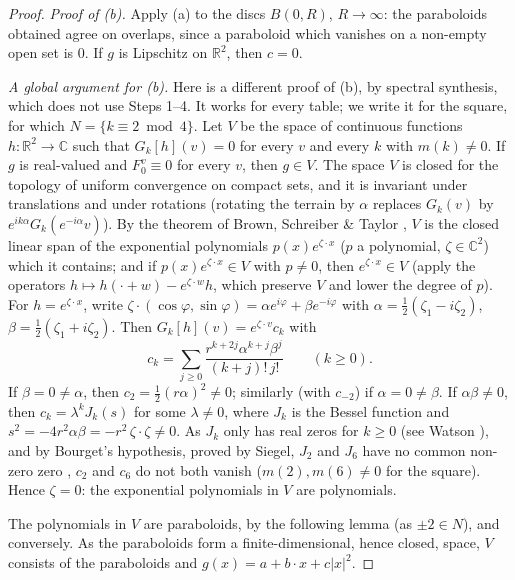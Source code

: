 \documentclass[a4paper,11pt,twoside,leqno]{article}
\newcommand{\rr}[0]{\ensuremath{\mathbb{R}}}
\numberwithin{equation}{section}
\begin{document}
\begin{proof}
\emph{Proof of (b).} Apply (a) to the discs $B(0, R)$, $R \to \infty$: the paraboloids obtained agree on overlaps, since a paraboloid which vanishes on a non-empty open set is $0$. If $g$ is Lipschitz on $\rr^2$, then $c = 0$.

\emph{A global argument for (b).} Here is a different proof of (b), by spectral synthesis, which does not use Steps 1--4. It works for every table; we write it for the square, for which $N = \{k \equiv 2 \bmod 4\}$. Let $V$ be the space of continuous functions $h : \rr^2 \to \mathbb{C}$ such that $G_k[h](v) = 0$ for every $v$ and every $k$ with $m(k) \neq 0$. If $g$ is real-valued and $F_0^v \equiv 0$ for every $v$, then $g \in V$. The space $V$ is closed for the topology of uniform convergence on compact sets, and it is invariant under translations and under rotations (rotating the terrain by $\alpha$ replaces $G_k(v)$ by $e^{ik\alpha} G_k(e^{-i\alpha} v)$). By the theorem of Brown, Schreiber \& Taylor \cite{BST}, $V$ is the closed linear span of the exponential polynomials $p(x) e^{\zeta \cdot x}$ ($p$ a polynomial, $\zeta \in \mathbb{C}^2$) which it contains; and if $p(x)e^{\zeta\cdot x} \in V$ with $p \neq 0$, then $e^{\zeta \cdot x} \in V$ (apply the operators $h \mapsto h(\cdot + w) - e^{\zeta \cdot w} h$, which preserve $V$ and lower the degree of $p$). For $h = e^{\zeta\cdot x}$, write $\zeta \cdot (\cos\varphi, \sin\varphi) = \alpha e^{i\varphi} + \beta e^{-i\varphi}$ with $\alpha = \frac12(\zeta_1 - i\zeta_2)$, $\beta = \frac12(\zeta_1 + i\zeta_2)$. Then $G_k[h](v) = e^{\zeta\cdot v} c_k$ with
\[
c_k = \sum_{j \geq 0} \frac{r^{k+2j}\alpha^{k+j}\beta^j}{(k+j)!\, j!} \qquad (k \geq 0).
\]
If $\beta = 0 \neq \alpha$, then $c_2 = \frac12 (r\alpha)^2 \neq 0$; similarly (with $c_{-2}$) if $\alpha = 0 \neq \beta$. If $\alpha\beta \neq 0$, then $c_k = \lambda^k J_k(s)$ for some $\lambda \neq 0$, where $J_k$ is the Bessel function and $s^2 = -4r^2\alpha\beta = -r^2\, \zeta\cdot\zeta \neq 0$. As $J_k$ only has real zeros for $k \geq 0$ (see Watson \cite[\S{}15.25]{Wat}), and by Bourget's hypothesis, proved by Siegel, $J_{2}$ and $J_{6}$ have no common non-zero zero \cite[\S{}15.28]{Wat}, $c_{2}$ and $c_{6}$ do not both vanish ($m(2), m(6) \neq 0$ for the square). Hence $\zeta = 0$: the exponential polynomials in $V$ are polynomials.

The polynomials in $V$ are paraboloids, by the following lemma (as $\pm 2 \in N$), and conversely. As the paraboloids form a finite-dimensional, hence closed, space, $V$ consists of the paraboloids and $g(x) = a + b \cdot x + c|x|^2$.


\end{proof}
\end{document}
